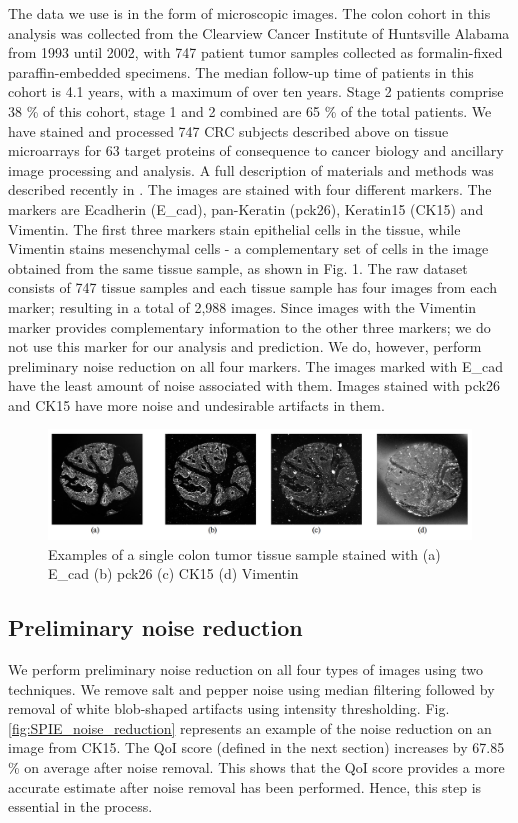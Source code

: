 The data we use is in the form of microscopic images. The colon cohort in this analysis was collected from the Clearview Cancer Institute of Huntsville Alabama from 1993 until 2002, with 747 patient tumor samples collected as formalin-fixed paraffin-embedded specimens. The median follow-up time of patients in this cohort is 4.1 years, with a maximum of over ten years. Stage 2 patients comprise 38 \% of this cohort, stage 1 and 2 combined are 65 \% of the total patients. We have stained and processed 747 CRC subjects described above on tissue microarrays for 63 target proteins of consequence to cancer biology and ancillary image processing and analysis. A full description of materials and methods was described recently in \cite{gerdes2013highly}.
The images are stained with four different markers. The markers are Ecadherin (E\_cad), pan-Keratin (pck26), Keratin15 (CK15) and Vimentin. The first three markers stain epithelial cells in the tissue, while Vimentin stains mesenchymal cells - a complementary set of cells in the image obtained from the same tissue sample, as shown in Fig. 1. The raw dataset consists of 747 tissue samples and each tissue sample has four images from each marker; resulting in a total of 2,988 images. Since images with the Vimentin marker provides complementary information to the other three markers; we do not use this marker for our analysis and prediction. We do, however, perform preliminary noise reduction on all four markers. The images marked with E\_cad have the least amount of noise associated with them. Images stained with pck26 and CK15 have more noise and undesirable artifacts in them.

\begin{figure}[H]
\centering
\includegraphics[width=1.0\textwidth]{img/SPIE_example_images}
\caption{Examples of a single colon tumor tissue sample stained with (a) E\_cad (b) pck26 (c) CK15 (d) Vimentin}
\label{fig:SPIE_example_images}
\end{figure}

\subsection{Preliminary noise reduction}
We perform preliminary noise reduction on all four types of images using two techniques. We remove salt and pepper noise using median filtering \cite{huang1979fast} followed by removal of white blob-shaped artifacts using intensity thresholding. Fig. \ref{fig:SPIE_noise_reduction} represents an example of the noise reduction on an image from CK15.  The QoI score (defined in the next section) increases by 67.85 \% on average after noise removal. This shows that the QoI score provides a more accurate estimate after noise removal has been performed. Hence, this step is essential in the process.

